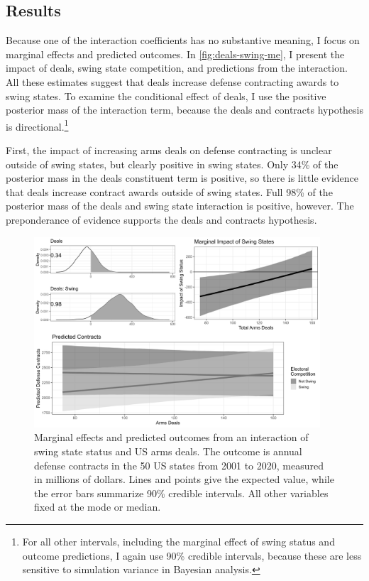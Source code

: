 \documentclass[12pt]{article}
\begin{document}


\subsection{Results}


Because one of the interaction coefficients has no substantive meaning, I focus on marginal effects and predicted outcomes.
In \autoref{fig:deals-swing-me}, I present the impact of deals, swing state competition, and predictions from the interaction.
All these estimates suggest that deals increase defense contracting awards to swing states. 
To examine the conditional effect of deals, I use the positive posterior mass of the interaction term, because the deals and contracts hypothesis is directional.\footnote{For all other intervals, including the marginal effect of swing status and outcome predictions, I again use 90\% credible intervals, because these are less sensitive to simulation variance in Bayesian analysis.}


First, the impact of increasing arms deals on defense contracting is unclear outside of swing states, but clearly positive in swing states. 
Only 34\% of the posterior mass in the deals constituent term is positive, so there is little evidence that deals increase contract awards outside of swing states. 
Full 98\% of the posterior mass of the deals and swing state interaction is positive, however. 
The preponderance of evidence supports the deals and contracts hypothesis.


\begin{figure}[htpb]
	\centering
		\includegraphics[width=0.95\textwidth]{../figures/deals-swing-me.png}
	\caption{Marginal effects and predicted outcomes from an interaction of swing state status and US arms deals. The outcome is annual defense contracts in the 50 US states from 2001 to 2020, measured in millions of dollars. Lines and points give the expected value, while the error bars summarize 90\% credible intervals. All other variables fixed at the mode or median.}
	\label{fig:deals-swing-me}
\end{figure}
\end{document}
